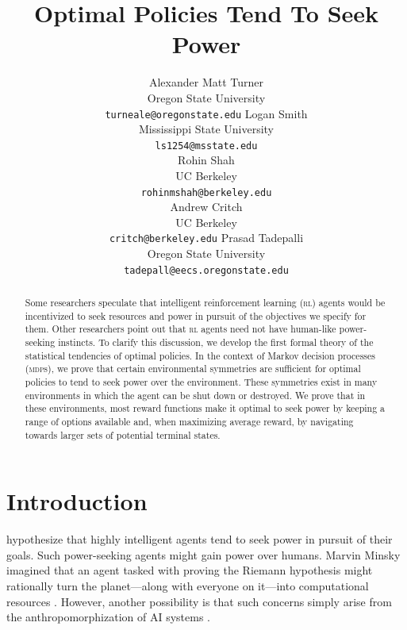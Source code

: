 \documentclass{article}
\newcommand*{\mdp}[1][m]{{\textsc{#1dp}}}
\newcommand*{\rl}[1][r]{{\textsc{#1l}}}
\theoremstyle{definition}
\begin{document}
\title{Optimal Policies Tend To Seek Power} 
\author{
Alexander Matt Turner\\
Oregon State University\\
\texttt{turneale@oregonstate.edu} 
\And
Logan Smith\\
Mississippi State University\\
\texttt{ls1254@msstate.edu} \\
\And
Rohin Shah\\
UC Berkeley\\
\texttt{rohinmshah@berkeley.edu}\\
\And 
Andrew Critch\\
UC Berkeley\\
\texttt{critch@berkeley.edu}
\And
Prasad Tadepalli\\
Oregon State University\\
\texttt{tadepall@eecs.oregonstate.edu}\\
}

\maketitle 


\begin{abstract}
Some researchers speculate that intelligent reinforcement learning ({\rl}) agents would be incentivized to seek resources and power in pursuit of the objectives we specify for them. Other researchers point out that {\rl} agents need not have human-like power-seeking instincts. To clarify this discussion, we develop the first formal theory of the statistical tendencies of optimal policies. In the context of Markov decision processes ({\mdp}s), we prove that certain environmental symmetries are sufficient for optimal policies to tend to seek power over the environment. These symmetries exist in many environments in which the agent can be shut down or destroyed. We prove that in these environments, most reward functions make it optimal to seek power by keeping a range of options available and, when maximizing average reward, by navigating towards larger sets of potential terminal states.
\end{abstract}

\section{Introduction} 
\citet{omohundro_basic_2008,bostrom_superintelligence_2014,russell_human_2019} hypothesize that highly intelligent agents tend to seek power in pursuit of their goals. Such power-seeking agents might gain power over humans. Marvin Minsky imagined that an agent tasked with proving the Riemann hypothesis might rationally turn the planet—along with everyone on it—into computational resources \citep{russell_artificial_2009}. However, another possibility is that such concerns simply arise from the anthropomorphization of AI systems \citep{lecun_dont_2019,instrumental,steven_2020,mitchell2021ai}.
\end{document}
